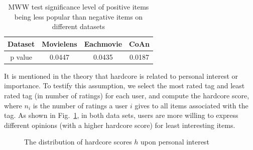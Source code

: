\documentclass[sigconf]{acmart}
\begin{document}
\begin{table}[htp]
\caption{MWW test significance level of positive items being less popular than negative items on different datasets}
\begin{center}
\small
\begin{tabular}{|c|c|c|c|}
\hline
Dataset & Movielens & Eachmovie & CoAn \\\hline
\hline
p value & 0.0447 & 0.0435 & 0.0187 \\\hline 
\end{tabular}
\end{center}
\label{tab:popularity}
\end{table}

It is mentioned in the theory\cite{Neolle-Neumann1993spiral} that hardcore is related to personal interest or importance. To testify this assumption, we select the most rated tag and least rated tag (in number of ratings) for each user, and compute the hardcore score, where $n_i$ is the number of ratings a user $i$ gives to all items associated with the tag.  As shown in Fig.~\ref{fig:personalinterest}, in both data sets, users are more willing to express different opinions (with a higher hardcore score) for least interesting items.

\begin{figure}[htbp]
\centering
\centering
{}
\caption{The distribution of hardcore scores $h$ upon personal interest}
\label{fig:personalinterest}
\end{figure}
\end{document}
